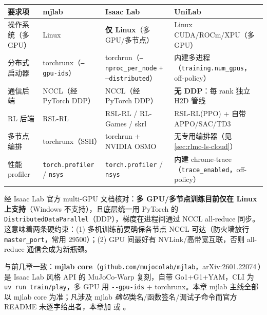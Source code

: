 \begin{center}
\small
\begin{tabular}{@{}p{3.0cm}p{3.5cm}p{3.8cm}p{2.6cm}@{}}
\toprule
要求项 & mjlab & Isaac Lab & UniLab \\
\midrule
操作系统（多 GPU） & Linux & \textbf{仅 Linux}（多 GPU/多节点） & Linux CUDA/ROCm/XPU（多 GPU） \\
分布式启动器 & torchrunx（\texttt{--gpu-ids}） & torchrun（\texttt{--nproc\_per\_node} \texttt{+ --distributed}） & 内建多进程（\texttt{training.num\_gpus}，off-policy） \\
通信后端 & NCCL（经 PyTorch DDP） & NCCL（经 PyTorch DDP） & \textbf{无 DDP}：每 rank 独立 H2D 管线 \\
RL 后端 & RSL-RL & RSL-RL / RL-Games / skrl & RSL-RL(PPO) + 自带 APPO/SAC/TD3 \\
多节点编排 & torchrunx（SSH） & torchrun + NVIDIA OSMO & 无专用编排器（见 \cref{sec:rlmc-ls-cloud}） \\
性能 profiler & \texttt{torch.profiler} / \texttt{nsys} & \texttt{torch.profiler} / \texttt{nsys} & 内建 chrome-trace（\texttt{trace\_enabled}，off-policy） \\
\bottomrule
\end{tabular}
\end{center}

\begin{note}
经 Isaac Lab 官方 multi-GPU 文档核对：\textbf{多 GPU/多节点训练目前仅在 Linux 上支持}（Windows 不支持），且底层统一用 PyTorch 的 \texttt{DistributedDataParallel}（DDP），梯度在进程间通过 NCCL all-reduce 同步\cite{mittal2025isaaclab}。这意味着两条硬约束：(1) 多机训练前要确保各节点 NCCL 可达（防火墙放行 \verb|master_port|，常用 29500）；(2) GPU 间最好有 NVLink/高带宽互联，否则 all-reduce 通信会成为新瓶颈。
\end{note}

\begin{note}
与前几章一致：\textbf{mjlab core}（\verb|github.com/mujocolab/mjlab|，arXiv:2601.22074\,\cite{mjlab2026}）是 Isaac Lab 风格 API 的 MuJoCo-Warp 复刻，自带 Go1+G1+YAM，CLI 为 \verb|uv run train/play|，多 GPU 用 \verb|--gpu-ids| + torchrunx\cite{schwarke2025rslrl}。本章 mjlab 主线全部以 mjlab core 为准；凡涉及 mjlab \emph{确切}类名/函数签名/调试子命令而官方 README 未逐字给出者，本章加 \rebuilt{} 或 。
\end{note}

